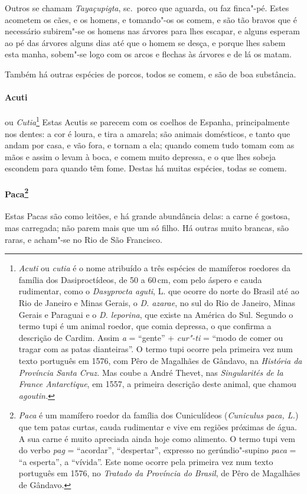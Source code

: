  Outros se chamam \textit{Tayaçupigta}, sc.~porco que aguarda, ou faz
finca"-pé. Estes acometem os cães, e os homens, e tomando"-os os comem, e
são tão bravos que é necessário subirem"-se os homens nas árvores para
lhes escapar, e alguns esperam ao pé das árvores alguns dias até que o
homem se desça, e porque lhes sabem esta manha, sobem"-se logo com os
arcos e flechas às árvores e de lá os matam. 

Também há outras espécies de porcos, todos se comem, e são de boa substância.

\paragraph{Acuti} ou \textit{Cutia}\footnote{ \textit{Acuti} ou
\textit{cutia} é o nome atribuído a três espécies de mamíferos
roedores da família dos Dasiproctídeos, de 50 a 60\,cm, com pelo áspero e
cauda rudimentar, como o \textit{Dasyprocta aguti}, L. que ocorre do
norte do Brasil até ao Rio de Janeiro e Minas Gerais, o \textit{D.
azarae}, no sul do Rio de Janeiro, Minas Gerais e Paraguai e o
\textit{D. leporina}, que existe na América do Sul. Segundo o
termo tupi é um animal roedor, que comia depressa, o que confirma a
descrição de Cardim. Assim \textit{a} = ``gente'' + \textit{cur"-ti} = 
``modo de comer ou tragar com as patas dianteiras''. O termo tupi ocorre
pela primeira vez num texto português em 1576, com Pêro de Magalhães de
Gândavo, na \textit{História da Província Santa Cruz.} Mas coube a
André Thevet, nas \textit{Singularités de la France Antarctique}, em
1557, a primeira descrição deste animal, que chamou
\textit{agoutin.}} Estas Acutis se parecem com os coelhos de
Espanha, principalmente nos dentes: a cor é loura, e tira a amarela;
são animais domésticos, e tanto que andam por casa, e vão fora, e
tornam a ela; quando comem tudo tomam com as mãos e assim o levam à
boca, e comem muito depressa, e o que lhes sobeja escondem para quando
têm fome. Destas há muitas espécies, todas se comem. 

\paragraph{Paca\footnote{ \textit{Paca} é um mamífero
roedor da família dos Cuniculídeos (\textit{Cuniculus paca, L.}) que
tem patas curtas, cauda rudimentar e vive em regiões próximas de água.
A sua carne é muito apreciada ainda hoje como alimento. O termo tupi
vem do verbo \textit{pag} = ``acordar'', ``despertar'', expresso no
gerúndio"-supino \textit{paca} = ``a esperta'', a ``vívida''. Este nome
ocorre pela primeira vez num texto português em 1576, no
\textit{Tratado da Província do Brasil}, de Pêro de Magalhães de Gândavo.}}
Estas Pacas são como leitões, e há grande abundância delas:
a carne é gostosa, mas carregada; não parem mais que um só filho. Há
outras muito brancas, são raras, e acham"-se no Rio de São Francisco. 

